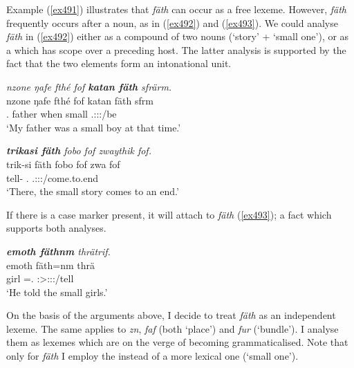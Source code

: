 Example (\ref{ex491}) illustrates that \emph{fäth} can occur as a free lexeme. However, \emph{fäth} frequently occurs after a noun, as in (\ref{ex492}) and (\ref{ex493}). We could analyse \emph{fäth} in (\ref{ex492}) either as a compound of two nouns (`story' + `small one'), or as a   which has scope over a preceding host. The latter analysis is supported by the fact that the two elements form an intonational unit.

\begin{exe}
	\ex \emph{nzone ŋafe fthé fof \textbf{katan fäth} sfrärm.}\\
	\gll nzone ŋafe fthé fof katan fäth sfrm\\
	\Fsg.\Poss{} father when \Emph{} small \Dim{} \Tsg.\Masc:\Sbj:\Pst:\Dur/be\\
	\trans `My father was a small boy at that time.'
	\label{ex491}
\end{exe}
\begin{exe}
	\ex \emph{\textbf{trikasi fäth} fobo fof zwaythik fof.}\\
	\gll trik-si fäth fobo fof zwa fof\\
	tell-\Nmlz{} \Dim{} \Dist.\All{} \Emph{} \Tsg.\F:\Sbj:\Rpst:\Ipfv/come.to.end \Emph\\
	\trans `There, the small story comes to an end.'
	\label{ex492}
\end{exe}

If there is a case marker present, it will attach to \emph{fäth} (\ref{ex493}); a fact which supports both analyses.

\begin{exe}
	\ex \emph{\textbf{emoth fäthnm} thrätrif.}\\
	\gll emoth fäth=nm thrä\\
	girl \Dim=\Dat.\Nsg{} \Stsg:\Sbj>\Stpl:\Io:\Rpst:\Pfv/tell\\
	\trans `He told the small girls.'
	\label{ex493}
\end{exe}

On the basis of the arguments above, I decide to treat \emph{fäth} as an independent lexeme. The same applies to \emph{zn}, \emph{faf} (both `place') and \emph{fur} (`bundle'). I analyse them as lexemes which are on the verge of becoming grammaticalised. Note that only for \emph{fäth} I employ the  \Dim{} instead of a more lexical one (`small one').

